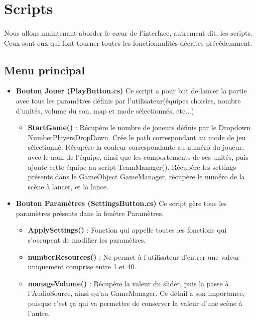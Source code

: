 \documentclass{article}
\begin{document}
\section{Scripts}

\paragraph{}
Nous allons maintenant aborder le cœur de l'interface, autrement dit, les scripts. Ceux sont eux qui font tourner toutes les fonctionnalités décrites précédemment.

\subsection{Menu principal}

\begin{itemize}
\item \textbf{Bouton Jouer (PlayButton.cs)}
\smallbreak
Ce script a pour but de lancer la partie avec tous les paramètres définis par l'utilisateur(équipes choisies, nombre d'unités, volume du son, map et mode sélectionnés, etc...)\newline
\smallbreak
\begin{itemize}
\item\textbf{StartGame()} : Récupère le nombre de joueurs définis par le Dropdown NumberPlayersDropDown. Crée le path correspondant au mode de jeu sélectionné. Récupère la couleur correspondante au numéro du joueur, avec le nom de l'équipe, ainsi que les comportements de ses unités, puis ajoute cette équipe au script TeamManager().\newline
Récupère les settings présents dans le GameObject GameManager, récupère le numéro de la scène à lancer, et la lance.
\end{itemize}
\item \textbf{Bouton Paramètres (SettingsButton.cs)}
\smallbreak
Ce script gère tous les paramètres présents dans la fenêtre Paramètres.\newline \smallbreak
\begin{itemize}
\item\textbf{ApplySettings()} : Fonction qui appelle toutes les fonctions qui s'occupent de modifier les paramètres.\newline
\item\textbf{numberResources()} : Ne permet à l'utilisateur d'entrer une valeur uniquement comprise entre 1 et 40.\newline
\item\textbf{manageVolume()} : Récupère la valeur du slider, puis la passe à l'AudioSource, ainsi qu'au GameManager. Ce détail a son importance, puisque c'est ça qui va permettre de conserver la valeur d'une scène à l'autre.
\end{itemize}
\end{itemize}
\end{document}
